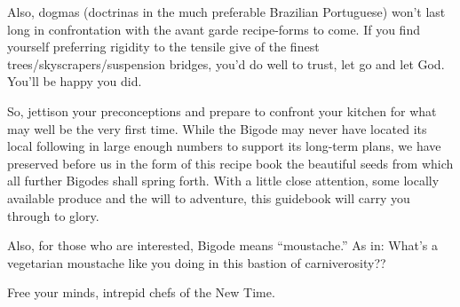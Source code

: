 Also, dogmas (doctrinas in the much preferable Brazilian Portuguese)
won't last long in confrontation with the avant garde recipe-forms to
come.  If you find yourself preferring rigidity to the tensile give of
the finest trees/\-skyscrapers/\-suspension bridges, you'd do well to
trust, let go and let God.  You'll be happy you did.

So, jettison your preconceptions and prepare to confront your kitchen
for what may well be the very first time.  While the Bigode may never
have located its local following in large enough numbers to support
its long-term plans, we have preserved before us in the form of this
recipe book the beautiful seeds from which all further Bigodes shall
spring forth.  With a little close attention, some locally available
produce and the will to adventure, this guidebook will carry you
through to glory.

Also, for those who are interested, Bigode means ``moustache.'' As in:
What's a vegetarian moustache like you doing in this bastion of
carniverosity??

Free your minds, intrepid chefs of the New Time.

